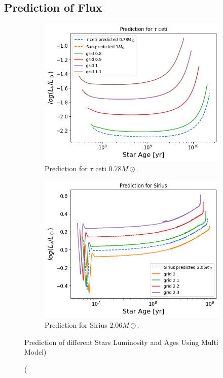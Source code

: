 \subsection{Prediction of Flux}

\begin{figure}[H]
	\centering
	\begin{subfigure}{\textwidth}
		\centering
		\includegraphics[width=\textwidth,height=0.4\textheight]{assets/predtauceti.png}
		\caption{Prediction for $\tau$ ceti $0.78 M\odot$.}
		\label{fig:tau}	
	\end{subfigure}
	\begin{subfigure}{\textwidth}
		\centering
		\includegraphics[width=\textwidth,height=0.4\textheight]{assets/predsirius.png}
		\caption{Prediction for Sirius $2.06 M\odot$.}
		\label{fig:Sirius}
	\end{subfigure}
	\caption(Prediction of different Stars Luminosity and Ages Using Multi Model)
	\label{fig:predict}
\end{figure}            
\begin{figure}[H]

\end{figure}



